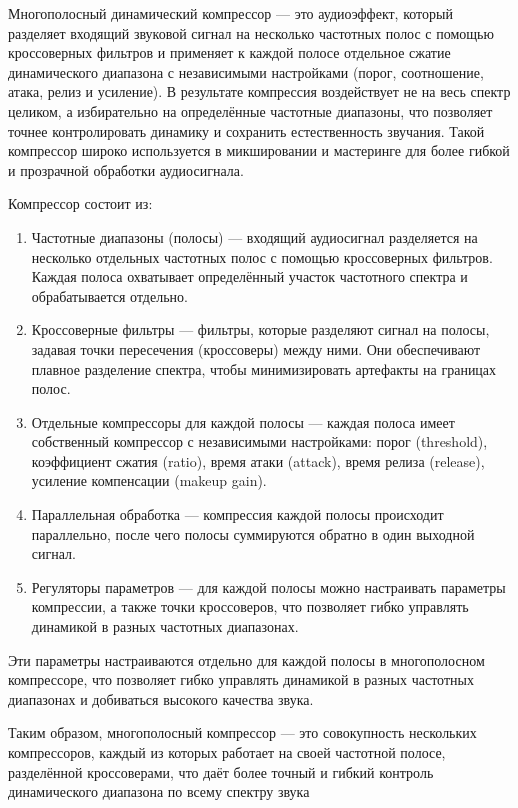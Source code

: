 Многополосный динамический компрессор — это аудиоэффект, который разделяет входящий звуковой сигнал на несколько частотных полос с помощью кроссоверных фильтров и применяет к каждой полосе отдельное сжатие динамического диапазона с независимыми настройками (порог, соотношение, атака, релиз и усиление). В результате компрессия воздействует не на весь спектр целиком, а избирательно на определённые частотные диапазоны, что позволяет точнее контролировать динамику и сохранить естественность звучания. Такой компрессор широко используется в микшировании и мастеринге для более гибкой и прозрачной обработки аудиосигнала.

Компрессор состоит из:
\begin{enumerate}
	\item Частотные диапазоны (полосы) — входящий аудиосигнал разделяется на несколько отдельных частотных полос с помощью кроссоверных фильтров. Каждая полоса охватывает определённый участок частотного спектра и обрабатывается отдельно.
	\item Кроссоверные фильтры — фильтры, которые разделяют сигнал на полосы, задавая точки пересечения (кроссоверы) между ними. Они обеспечивают плавное разделение спектра, чтобы минимизировать артефакты на границах полос.
	\item Отдельные компрессоры для каждой полосы — каждая полоса имеет собственный компрессор с независимыми настройками: порог (threshold), коэффициент сжатия (ratio), время атаки (attack), время релиза (release), усиление компенсации (makeup gain).
	\item Параллельная обработка — компрессия каждой полосы происходит параллельно, после чего полосы суммируются обратно в один выходной сигнал.
	\item Регуляторы параметров — для каждой полосы можно настраивать параметры компрессии, а также точки кроссоверов, что позволяет гибко управлять динамикой в разных частотных диапазонах.
\end{enumerate}

Эти параметры настраиваются отдельно для каждой полосы в многополосном компрессоре, что позволяет гибко управлять динамикой в разных частотных диапазонах и добиваться высокого качества звука.

Таким образом, многополосный компрессор — это совокупность нескольких компрессоров, каждый из которых работает на своей частотной полосе, разделённой кроссоверами, что даёт более точный и гибкий контроль динамического диапазона по всему спектру звука

